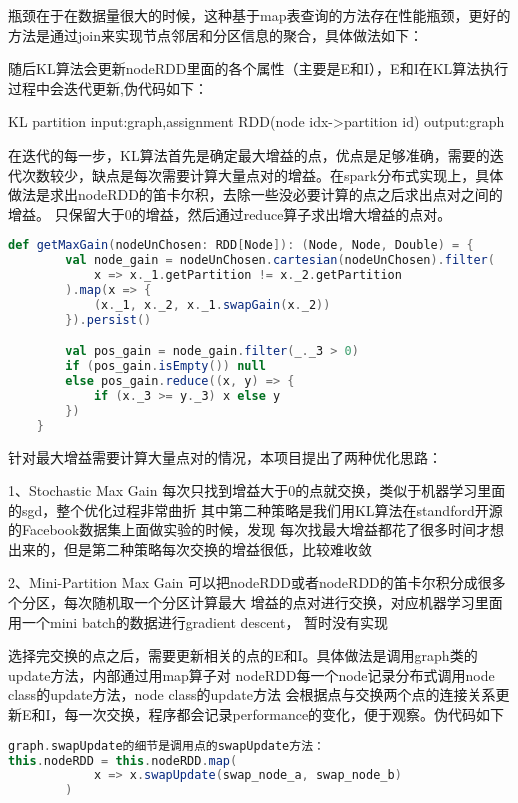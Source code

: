 瓶颈在于在数据量很大的时候，这种基于map表查询的方法存在性能瓶颈，更好的方法是通过join来实现节点邻居和分区信息的聚合，具体做法如下：

随后KL算法会更新nodeRDD里面的各个属性（主要是E和I），E和I在KL算法执行过程中会迭代更新,伪代码如下：

KL partition
input:graph,assignment RDD(node idx->partition id)
output:graph


在迭代的每一步，KL算法首先是确定最大增益的点，优点是足够准确，需要的迭代次数较少，缺点是每次需要计算大量点对的增益。在spark分布式实现上，具体做法是求出nodeRDD的笛卡尔积，去除一些没必要计算的点之后求出点对之间的增益。
只保留大于0的增益，然后通过reduce算子求出增大增益的点对。
\begin{lstlisting}[language=Scala]
def getMaxGain(nodeUnChosen: RDD[Node]): (Node, Node, Double) = {
        val node_gain = nodeUnChosen.cartesian(nodeUnChosen).filter(
            x => x._1.getPartition != x._2.getPartition
        ).map(x => {
            (x._1, x._2, x._1.swapGain(x._2))
        }).persist()

        val pos_gain = node_gain.filter(_._3 > 0)
        if (pos_gain.isEmpty()) null
        else pos_gain.reduce((x, y) => {
            if (x._3 >= y._3) x else y
        })
    }
\end{lstlisting}

针对最大增益需要计算大量点对的情况，本项目提出了两种优化思路：

1、Stochastic Max Gain
每次只找到增益大于0的点就交换，类似于机器学习里面的sgd，整个优化过程非常曲折
其中第二种策略是我们用KL算法在standford开源的Facebook数据集上面做实验的时候，发现
每次找最大增益都花了很多时间才想出来的，但是第二种策略每次交换的增益很低，比较难收敛

2、Mini-Partition Max Gain
可以把nodeRDD或者nodeRDD的笛卡尔积分成很多个分区，每次随机取一个分区计算最大
增益的点对进行交换，对应机器学习里面用一个mini batch的数据进行gradient descent，
暂时没有实现

选择完交换的点之后，需要更新相关的点的E和I。具体做法是调用graph类的update方法，内部通过用map算子对
nodeRDD每一个node记录分布式调用node class的update方法，node class的update方法
会根据点与交换两个点的连接关系更新E和I，每一次交换，程序都会记录performance的变化，便于观察。伪代码如下

\begin{lstlisting}[language=Scala]
graph.swapUpdate的细节是调用点的swapUpdate方法：
this.nodeRDD = this.nodeRDD.map(
            x => x.swapUpdate(swap_node_a, swap_node_b)
        )
\end{lstlisting}

